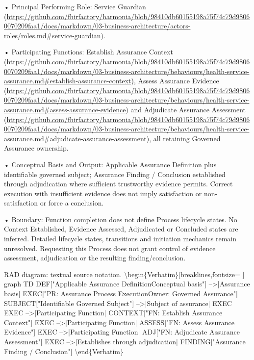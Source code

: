 •
Principal Performing Role: Service Guardian (\url{https://github.com/fhirfactory/harmonia/blob/98410db60155198a75f74c79d98060070209faa1/docs/markdown/03-business-architecture/actors-roles/roles.md#service-guardian}).



•
Participating Functions: Establish Assurance Context (\url{https://github.com/fhirfactory/harmonia/blob/98410db60155198a75f74c79d98060070209faa1/docs/markdown/03-business-architecture/behaviours/health-service-assurance.md#establish-assurance-context}), Assess Assurance Evidence (\url{https://github.com/fhirfactory/harmonia/blob/98410db60155198a75f74c79d98060070209faa1/docs/markdown/03-business-architecture/behaviours/health-service-assurance.md#assess-assurance-evidence}) and Adjudicate Assurance Assessment (\url{https://github.com/fhirfactory/harmonia/blob/98410db60155198a75f74c79d98060070209faa1/docs/markdown/03-business-architecture/behaviours/health-service-assurance.md#adjudicate-assurance-assessment}), all retaining Governed Assurance ownership.



•
Conceptual Basis and Output: Applicable Assurance Definition plus identifiable governed subject; Assurance Finding / Conclusion established through adjudication where sufficient trustworthy evidence permits. Correct execution with insufficient evidence does not imply satisfaction or non-satisfaction or force a conclusion.



•
Boundary: Function completion does not define Process lifecycle states. No Context Established, Evidence Assessed, Adjudicated or Concluded states are inferred. Detailed lifecycle states, transitions and initiation mechanics remain unresolved. Requesting this Process does not grant control of evidence assessment, adjudication or the resulting finding/conclusion.



RAD diagram: textual source notation.
\textbackslash{}begin\{Verbatim\}[breaklines,fontsize=
]
graph TD
    DEF["Applicable Assurance Definition\newline{}Conceptual basis"] -->|Assurance basis| EXEC["PR: Assurance Process Execution\newline{}Owner: Governed Assurance"]
    SUBJECT["Identifiable Governed Subject"] -->|Subject of assurance| EXEC
    EXEC -->|Participating Function| CONTEXT["FN: Establish Assurance Context"]
    EXEC -->|Participating Function| ASSESS["FN: Assess Assurance Evidence"]
    EXEC -->|Participating Function| ADJ["FN: Adjudicate Assurance Assessment"]
    EXEC -->|Establishes through adjudication| FINDING["Assurance Finding / Conclusion"]
\textbackslash{}end\{Verbatim\}



